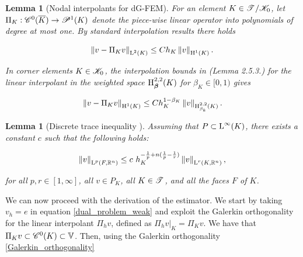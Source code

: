\documentclass[a4paper,11pt]{article}
\newtheorem{lemma}[theorem]{Lemma}
\begin{document}
{\begin{lemma}[Nodal interpolants for dG-FEM]
\label{lemma:nodal_interpolation}
For an element $K \in \mathscr T^{}\slash \mathscr K_{0}$, let $\Pi_{K}: \mathscr C^{0}(\overline{K}) \rightarrow \mathscr P^{1}(K)$ denote the piece-wise linear operator into polynomials of degree at most one. By standard interpolation results \cite{BS:2008} there holds

\begin{equation}
    \left\| v - \Pi_{K}v\right\|_{\operatorname L^{2}(K)} \leq C h_{K} \left\|v\right\|_{\operatorname H^{1}(K)}.
\end{equation}


In corner elements $K \in \mathscr K_{0}$, the interpolation bounds in \cite{Wihler:2003,Schwab:1998} (Lemma 2.5.3.) for the linear interpolant in the weighted space $\operatorname H^{2,2}_{\boldsymbol \beta}(K)$ for $\beta_{K} \in [0,1)$ gives

\begin{equation}
      \left\| v - \Pi_{K}v\right\|_{\operatorname H^{1}(K)} \leq C h_{K}^{1-\beta_{K}} \left\|v\right\|_{\operatorname H^{2,2}_{\beta_{k}}(K)}.
\end{equation}

\end{lemma}


\begin{lemma}[Discrete trace inequality {\cite{Guermond:2021}}]
\label{lemma:discrete_trace_ineq}
Assuming that $P \subset \operatorname L^{\infty}(K)$, there exists a constant $c$ such that the following holds:

\begin{equation}
    \left\|v\right\|_{\operatorname L^{p}(F,\mathbb R^{n})} \leq c \  h_{K}^{-\frac{1}{p} + n(\frac{1}{p} - \frac{1}{r})}\left\|v\right\|_{\operatorname L^{r}(K,\mathbb R^{n})},
\end{equation}

for all $p,r \in [1,\infty]$, all $v \in P_{K}$, all $K \in \mathscr T^{}$, and all the faces $F$ of $K$.

\end{lemma}

We can now proceed with the derivation of the estimator. We start by taking $v_{h} = e$ in equation \eqref{dual_problem_weak} and exploit the Galerkin orthogonality for the linear interpolant $\Pi_{h}v$, defined as $\Pi_{h}v |_{K} = \Pi_{K}v$. We have that $\Pi_{K}v \subset \mathscr C^{0}(K) \subset \mathbb V$. Then, using the Galerkin orthogonality \eqref{Galerkin_orthogonality}

}
\end{document}
